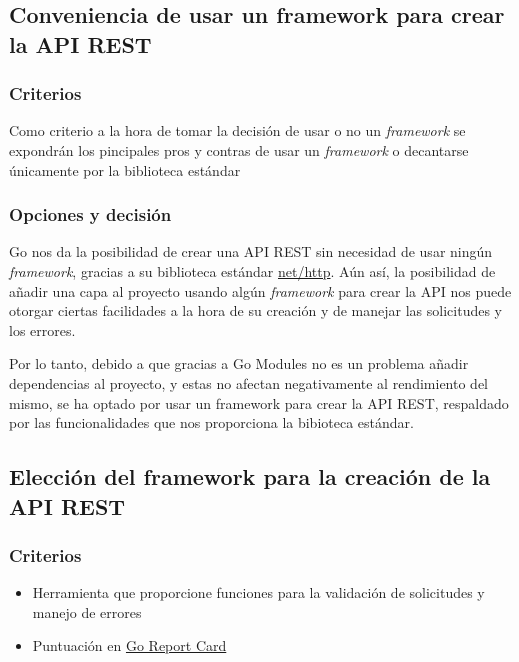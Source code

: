 \subsection{Conveniencia de usar un framework para crear la API REST}

\subsubsection{Criterios}

Como criterio a la hora de tomar la decisión de usar o no un \textit{framework} se expondrán los pincipales pros y contras de usar un \textit{framework} o decantarse únicamente por la biblioteca estándar

\subsubsection{Opciones y decisión}

Go nos da la posibilidad de crear una API REST sin necesidad de usar ningún \textit{framework}, gracias a su biblioteca estándar \href{https://pkg.go.dev/net/http}{net/http}.
Aún así, la posibilidad de añadir una capa al proyecto usando algún \textit{framework} para crear la API nos puede otorgar ciertas facilidades a la hora de su creación y de manejar las solicitudes y los errores.

Por lo tanto, debido a que gracias a Go Modules no es un problema añadir dependencias al proyecto, y estas no afectan negativamente al rendimiento del mismo, se ha optado por usar
un framework para crear la API REST, respaldado por las funcionalidades que nos proporciona la bibioteca estándar.

\subsection{Elección del framework para la creación de la API REST}

\subsubsection{Criterios}

\begin{itemize}
\item
  Herramienta que proporcione funciones para la validación de solicitudes y manejo de errores
\item
  Puntuación en \href{https://goreportcard.com/}{Go Report Card}
\end{itemize}

